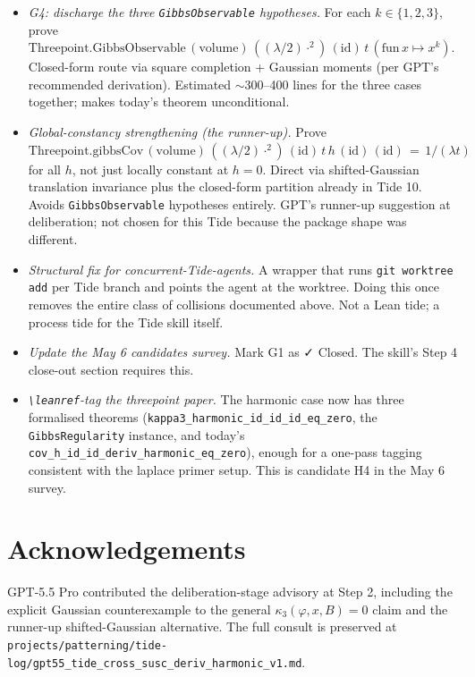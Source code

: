 \documentclass[11pt]{article}
\begin{document}
\begin{itemize}
\item \emph{G4: discharge the three \texttt{GibbsObservable} hypotheses.}
For each $k \in \{1, 2, 3\}$, prove
$\mathrm{Threepoint.GibbsObservable}\,(\mathrm{volume})\,((\lambda/2)\cdot^2)\,(\mathrm{id})\,t\,(\mathrm{fun}\,x \mapsto x^k)$.
Closed-form route via square completion + Gaussian moments
(per GPT's recommended derivation). Estimated $\sim$300--400 lines for
the three cases together; makes today's theorem unconditional.

\item \emph{Global-constancy strengthening (the runner-up).} Prove
$\mathrm{Threepoint.gibbsCov}\,(\mathrm{volume})\,((\lambda/2)\cdot^2)\,(\mathrm{id})\,t\,h\,(\mathrm{id})\,(\mathrm{id})\, =\, 1/(\lambda t)$
for all $h$, not just locally constant at $h = 0$. Direct via
shifted-Gaussian translation invariance plus the closed-form partition
already in Tide 10. Avoids \texttt{GibbsObservable} hypotheses
entirely. GPT's runner-up suggestion at deliberation; not chosen for
this Tide because the package shape was different.

\item \emph{Structural fix for concurrent-Tide-agents.} A wrapper
that runs \texttt{git worktree add} per Tide branch and points the
agent at the worktree. Doing this once removes the entire class of
collisions documented above. Not a Lean tide; a process tide for the
Tide skill itself.

\item \emph{Update the May 6 candidates survey.} Mark G1 as ✓ Closed.
The skill's Step 4 close-out section requires this.

\item \emph{\texttt{\textbackslash leanref}-tag the threepoint paper.}
The harmonic case now has three formalised theorems
(\texttt{kappa3\_harmonic\_id\_id\_id\_eq\_zero}, the
\texttt{GibbsRegularity} instance, and today's
\texttt{cov\_h\_id\_id\_deriv\_harmonic\_eq\_zero}), enough for a
one-pass tagging consistent with the laplace primer setup. This is
candidate H4 in the May 6 survey.
\end{itemize}

\section*{Acknowledgements}

GPT-5.5 Pro contributed the deliberation-stage advisory at Step 2,
including the explicit Gaussian counterexample to the general
$\kappa_3(\varphi, x, B) = 0$ claim and the runner-up
shifted-Gaussian alternative. The full consult is preserved at
\texttt{projects/patterning/tide-log/gpt55\_tide\_cross\_susc\_deriv\_harmonic\_v1.md}.
\end{document}
